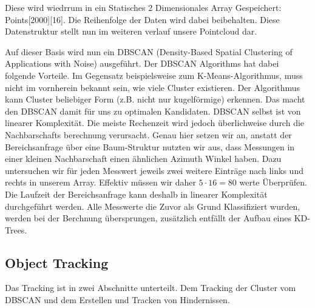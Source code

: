 \documentclass[11pt,oneside,openright]{mpreport}
\begin{document}
\begin{center}
\end{center}

Diese wird wiedrrum in ein Statisches 2 Dimensionales Array Gespeichert: Points[2000][16]. Die Reihenfolge der Daten wird dabei beibehalten.
Diese Datenstruktur stellt nun im weiteren verlauf unsere Pointcloud dar.

Auf dieser Basis wird nun ein DBSCAN (Density-Based Spatial Clustering of Applications with Noise) \cite{DBSCAN} ausgeführt. Der DBSCAN Algorithms hat dabei folgende Vorteile.
Im Gegensatz beispielsweise zum K-Means-Algorithmus, muss nicht im vornherein bekannt sein, wie viele Cluster existieren. Der Algorithmus kann Cluster beliebiger Form 
(z.B. nicht nur kugelförmige) erkennen. Das macht den DBSCAN damit für uns zu optimalen Kandidaten. DBSCAN selbst ist von linearer Komplexität.
Die meiste Rechenzeit wird jedoch überlichweise durch die Nachbarschafts berechnung verursacht. Genau hier setzen wir an, anstatt der Bereichsanfrage über eine Baum-Struktur
nutzten wir aus, dass Messungen in einer kleinen Nachbarschaft einen ähnlichen Azimuth Winkel haben. Dazu untersuchen wir für jeden Messwert jeweils zwei weitere Einträge nach links
und rechts in unserem Array. Effektiv müssen wir daher $5 \cdot 16 = 80$ werte Überprüfen. Die Laufzeit der Bereichsanfrage kann deshalb in linearer Komplexität durchgeführt
werden. Alle Messwerte die Zuvor als Grund Klassifiziert wurden, werden bei der Berchnung übersprungen, zusätzlich entfällt der Aufbau eines KD-Trees. 


\subsection{Object Tracking}
Das Tracking ist in zwei Abschnitte unterteilt. Dem Tracking der Cluster vom DBSCAN und dem Erstellen und Tracken von Hindernissen.
\end{document}
